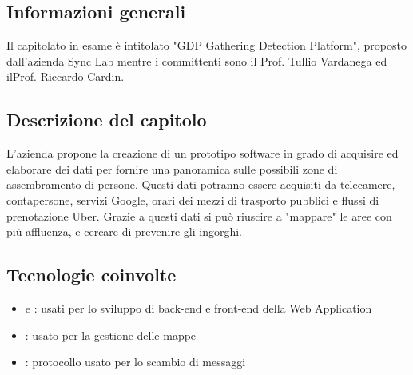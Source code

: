 \subsection{Informazioni generali}
Il capitolato in esame è intitolato "GDP Gathering Detection Platform", proposto dall'azienda Sync Lab mentre i committenti sono il Prof. Tullio Vardanega ed ilProf. Riccardo Cardin.
\subsection{Descrizione del capitolo}
L'azienda propone la creazione di un prototipo software in grado di acquisire ed elaborare dei dati per fornire una panoramica sulle possibili zone di assembramento di persone.
Questi dati potranno essere acquisiti da telecamere, contapersone, servizi Google, orari dei mezzi di trasporto pubblici e flussi di prenotazione Uber.
Grazie a questi dati si può riuscire a "mappare" le aree con più affluenza, e cercare di prevenire gli ingorghi.
\subsection{Tecnologie coinvolte}
\begin{itemize}
    \item {} e : usati per lo sviluppo di back-end e front-end della Web Application
    \item {}: usato per la gestione delle mappe
    \item {}: protocollo usato per lo scambio di messaggi

\end{itemize}
